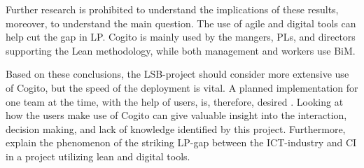 Further research is prohibited to understand the implications of these results, moreover, to understand the main question. The use of agile and digital tools can help cut the gap in LP. Cogito is mainly used by the mangers, PLs, and directors supporting the Lean methodology, while both management and workers use BiM.

Based on these conclusions, the LSB-project should consider more extensive use of Cogito, but the speed of the deployment is vital. A planned implementation for one team at the time, with the help of users, is, therefore, desired \cite{Robey&Sahay}. Looking at how the users make use of Cogito can give valuable insight into the interaction, decision making, and lack of knowledge identified by this project. Furthermore, explain the phenomenon of the striking LP-gap between the ICT-industry and CI in a project utilizing lean and digital tools. 




\cleardoublepage